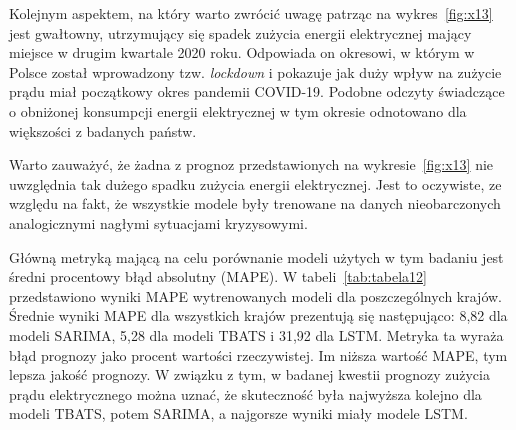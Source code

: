 \documentclass[polish, twoside, 12pt, a4paper]{article}
\makeatletter
\theoremstyle{definition}
\theoremstyle{plain}
\theoremstyle{remark}
\renewcommand\footnotesize{%
   \@setfontsize\footnotesize\@ixpt{10}%
   \abovedisplayskip 8\p@ \@plus2\p@ \@minus4\p@
   \abovedisplayshortskip \z@ \@plus\p@
   \belowdisplayshortskip 4\p@ \@plus2\p@ \@minus2\p@
   \def\@listi{\leftmargin\leftmargini
               \topsep 4\p@ \@plus2\p@ \@minus2\p@
               \parsep 2\p@ \@plus\p@ \@minus\p@
               \itemsep \parsep}%
   \belowdisplayskip \abovedisplayskip
}
\makeatother
\begin{document}
Kolejnym aspektem, na który warto zwrócić uwagę patrząc na wykres~\ref{fig:x13} jest gwałtowny, utrzymujący się spadek zużycia energii elektrycznej mający miejsce w drugim kwartale 2020 roku. Odpowiada on okresowi, w którym w Polsce został wprowadzony tzw. \textit{lockdown} i pokazuje jak duży wpływ na zużycie prądu miał początkowy okres pandemii COVID-19. Podobne odczyty świadczące o obniżonej konsumpcji energii elektrycznej w tym okresie odnotowano dla większości z badanych państw. 

Warto zauważyć, że żadna z prognoz przedstawionych na wykresie~\ref{fig:x13} nie uwzględnia tak dużego spadku zużycia energii elektrycznej. Jest to oczywiste, ze względu na fakt, że wszystkie modele były trenowane na danych nieobarczonych analogicznymi nagłymi sytuacjami kryzysowymi. 

Główną metryką mającą na celu porównanie modeli użytych w tym badaniu jest średni procentowy błąd absolutny (MAPE). W tabeli~\ref{tab:tabela12} przedstawiono wyniki MAPE wytrenowanych modeli dla poszczególnych krajów. Średnie wyniki MAPE dla wszystkich krajów prezentują się następująco: 8,82 dla modeli SARIMA, 5,28 dla modeli TBATS i 31,92 dla LSTM. Metryka ta wyraża błąd prognozy jako procent wartości rzeczywistej. Im niższa wartość MAPE, tym lepsza jakość prognozy. W związku z tym, w badanej kwestii prognozy zużycia prądu elektrycznego można uznać, że skuteczność była najwyższa kolejno dla modeli TBATS, potem SARIMA, a najgorsze wyniki miały modele LSTM. 



%
%
%  
%
%
%
%
\end{document}
